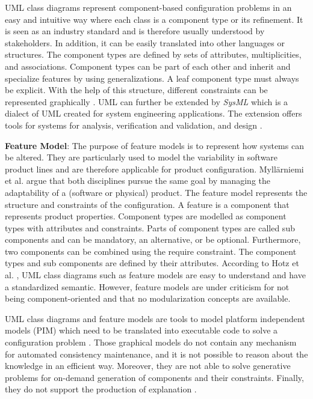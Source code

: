 UML class diagrams represent component-based configuration problems in an easy and intuitive way where each class is a component type or its refinement. It is seen as an industry standard and is therefore usually understood by stakeholders. In addition, it can be easily translated into other languages or structures. The component types are defined by sets of attributes, multiplicities, and associations. Component types can be part of each other and inherit and specialize features by using generalizations. A leaf component type must always be explicit. With the help of this structure, different constraints can be represented graphically \cite{hofestrybawo14a}. UML can further be extended by \textit{SysML} which is a dialect of UML created for system engineering applications. The extension offers tools for systems for analysis, verification and validation, and design \cite{SysML}.\newline

\textbf{Feature Model}: The purpose of feature models is to represent how systems can be altered. They are particularly used to model the variability in software product lines and are therefore applicable for product configuration. Myllärniemi et al. \cite{mytirafe14a} argue that both disciplines pursue the same goal by managing the adaptability of a (software or physical) product. The feature model represents the structure and constraints of the configuration. A feature is a component that represents product properties. Component types are modelled as component types with attributes and constraints. Parts of component types are called sub components and can be mandatory, an alternative, or be optional. Furthermore, two components can be combined using the require constraint. The component types and sub components are defined by their attributes. According to Hotz et al. \cite{hofestrybawo14a}, UML class diagrams such as feature models are easy to understand and have a standardized semantic. However, feature models are under criticism for not being component-oriented and that no modularization concepts are available. \newline

UML class diagrams and feature models are tools to model platform independent models (PIM) which need to be translated into executable code to solve a configuration problem \cite{sommerville10a, zhmezhya05a}. Those graphical models do not contain any mechanism for automated consistency maintenance, and it is not possible to reason about the knowledge in an efficient way. Moreover, they are not able to solve generative problems for on-demand generation of components and their constraints. Finally, they do not support the production of explanation \cite{hofestrybawo14a}. 

